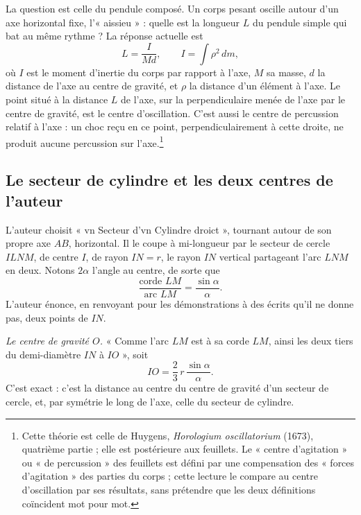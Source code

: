 \documentclass[11pt,a4paper]{article}
\begin{document}
La question est celle du pendule composé. Un corps pesant oscille autour d'un
axe horizontal fixe, l'« aissieu » : quelle est la longueur \(L\) du pendule
simple qui bat au même rythme ? La réponse actuelle est
\[
L=\frac{I}{Md},\qquad I=\int \rho^2\,dm ,
\]
où \(I\) est le moment d'inertie du corps par rapport à l'axe, \(M\) sa masse,
\(d\) la distance de l'axe au centre de gravité, et \(\rho\) la distance d'un
élément à l'axe. Le point situé à la distance \(L\) de l'axe, sur la
perpendiculaire menée de l'axe par le centre de gravité, est le centre
d'oscillation. C'est aussi le centre de percussion relatif à l'axe : un choc
reçu en ce point, perpendiculairement à cette droite, ne produit aucune
percussion sur l'axe.\footnote{Cette théorie est celle de Huygens,
\emph{Horologium oscillatorium} (1673), quatrième partie ; elle est postérieure
aux feuillets. Le « centre d'agitation » ou « de percussion » des feuillets est
défini par une compensation des « forces d'agitation » des parties du corps ;
cette lecture le compare au centre d'oscillation par ses résultats, sans
prétendre que les deux définitions coïncident mot pour mot.}

\subsection*{Le secteur de cylindre et les deux centres de l'auteur}

L'auteur choisit « vn Secteur d'vn Cylindre droict », tournant autour de son
propre axe \(AB\), horizontal. Il le coupe à mi-longueur par le secteur de
cercle \(ILNM\), de centre \(I\), de rayon \(IN=r\), le rayon \(IN\) vertical
partageant l'arc \(LNM\) en deux. Notons \(2\alpha\) l'angle au centre, de sorte
que
\[
\frac{\text{corde }LM}{\text{arc }LM}=\frac{\sin\alpha}{\alpha}.
\]
L'auteur énonce, en renvoyant pour les démonstrations à des écrits qu'il ne
donne pas, deux points de \(IN\).

\emph{Le centre de gravité \(O\).} « Comme l'arc \(LM\) est à sa corde \(LM\),
ainsi les deux tiers du demi-diamètre \(IN\) à \(IO\) », soit
\[
IO=\frac23\,r\,\frac{\sin\alpha}{\alpha}.
\]
C'est exact : c'est la distance au centre du centre de gravité d'un secteur de
cercle, et, par symétrie le long de l'axe, celle du secteur de cylindre.
\end{document}
